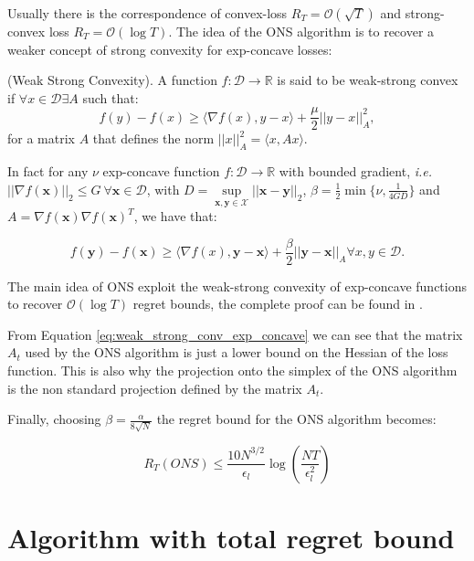 Usually there is the correspondence of convex-loss $R_T=\mathcal O(\sqrt T)$ and strong-convex loss $R_T=\mathcal O(\log T)$. The idea of the ONS algorithm is to recover a weaker concept of strong convexity for exp-concave losses:

\begin{definition}(Weak Strong Convexity).\label{def:weak_strong_cnvx}
A function $f:\mathcal D\to\mathbb R$ is said to be weak-strong convex if $\forall x\in\mathcal D\exists A$ such that: 
$$f(y)-f(x)\ge\langle\nabla f(x),y-x\rangle+\frac{\mu}{2}||y-x||_{A}^2,$$
for a matrix $A$ that defines the norm $||x||^2_{A}=\langle x, Ax\rangle$.
\end{definition}

In fact for any $\nu$ exp-concave function $f:\mathcal D\to\mathbb R$ with bounded gradient, \emph{i.e.} $||\nabla f(\mathbf x)||_2\le G\ \forall \mathbf x\in\mathcal D$, with $D=\sup\limits_{\mathbf x,\mathbf y\in\mathcal X}||\mathbf x-\mathbf y||_2$, $\beta=\frac{1}{2}\min\{\nu,\frac{1}{4GD}\}$ and $A=\nabla f(\mathbf x)\nabla f(\mathbf x)^T$, we have that: 

\begin{equation}\label{eq:weak_strong_conv_exp_concave}
f(\mathbf y)-f(\mathbf x)\ge\langle\nabla f(x),\mathbf y-\mathbf x\rangle+\frac{\beta}{2}||\mathbf y-\mathbf x||_{A}\forall x,y\in\mathcal D.
\end{equation}

The main idea of ONS exploit the weak-strong convexity of exp-concave functions to recover $\mathcal O(\log T)$ regret bounds, the complete proof can be found in \cite{hazan2007logarithmic}.

From Equation \eqref{eq:weak_strong_conv_exp_concave} we can see that the matrix $A_t$ used by the ONS algorithm is just a lower bound on the Hessian of the loss function. This is also why the projection onto the simplex of the ONS algorithm is the non standard projection defined by the matrix $A_t$.

Finally, choosing $\beta=\frac{\alpha}{8\sqrt{N}}$ the regret bound for the ONS algorithm becomes:

\begin{equation}\label{eq:regret_ONS}
R_T(ONS)\le\frac{10 N^{3/2}}{\epsilon_l}\log\left(\frac{NT}{\epsilon_l^2}\right)
\end{equation}

\section{Algorithm with total regret bound}

